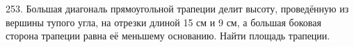 253. Большая диагональ прямоугольной трапеции делит
высоту, проведённую из вершины тупого угла, на отрезки
длиной 15 см и 9 см, а большая боковая сторона трапеции
равна её меньшему основанию. Найти площадь
трапеции.
\newpage
